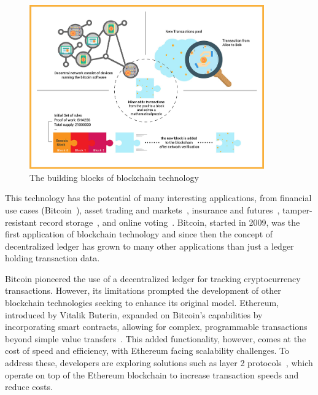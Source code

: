 \begin{figure}[t]
    \centering
     \includegraphics[width=0.9\textwidth]{figures/blockchain-buildingblocks.jpg}
    \caption[The Building Blocks of Blockchain Technology]{The building blocks of blockchain technology} 
\end{figure}


This technology has the potential of many interesting applications, from financial use cases (\eg Bitcoin~\cite{nakamoto2008bitcoin}), asset trading and markets~\cite{clark2014decentralizing,uniswapexplained}, insurance and futures~\cite{massacci2018futuresmex,muller2000weather}, tamper-resistant record storage~\cite{catenaEth}, and online voting~\cite{mccorry2017smart,aragonwebsite}. Bitcoin, started in 2009, was the first application of blockchain technology and since then the concept of decentralized ledger has grown to many other applications than just a ledger holding transaction data.


Bitcoin pioneered the use of a decentralized ledger for tracking cryptocurrency transactions. However, its limitations prompted the development of other blockchain technologies seeking to enhance its original model. Ethereum, introduced by Vitalik Buterin, expanded on Bitcoin’s capabilities by incorporating smart contracts, allowing for complex, programmable transactions beyond simple value transfers~\cite{buterin2014next}. This added functionality, however, comes at the cost of speed and efficiency, with Ethereum facing scalability challenges. To address these, developers are exploring solutions such as layer 2 protocols~\cite{clark2018sok:online,optimismgithub,kalodner2018arbitrum}, which operate on top of the Ethereum blockchain to increase transaction speeds and reduce costs.

